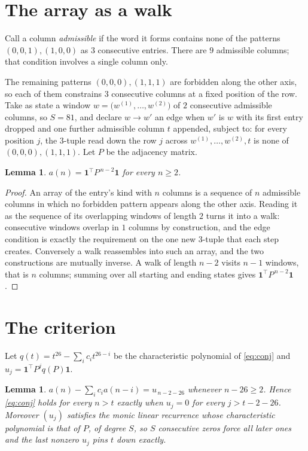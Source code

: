 \documentclass[11pt,a4paper]{article}
\theoremstyle{plain}
\newtheorem{lemma}[theorem]{Lemma}
\theoremstyle{definition}
\begin{document}
\section{The array as a walk}

Call a column \emph{admissible} if the word it forms contains none of the patterns
$(0,0,1), (1,0,0)$ as $3$ consecutive entries. There are $9$ admissible columns; that condition
involves a single column only.

The remaining patterns $(0,0,0), (1,1,1)$ are forbidden along the other axis, so each of them
constrains $3$ consecutive columns at a fixed position of the row. Take as state a
window $w=\bigl(w^{(1)},\dots,w^{(2)}\bigr)$ of $2$ consecutive admissible
columns, so $S=81$, and declare $w\to w'$ an edge when $w'$ is $w$ with its first entry
dropped and one further admissible column $t$ appended, subject to: for every position
$j$, the $3$-tuple read down the row $j$ across $w^{(1)},\dots,w^{(2)},t$
is none of $(0,0,0), (1,1,1)$. Let $P$ be the adjacency matrix.

\begin{lemma}\label{lem:walk}
$a(n)=\mathbf{1}^{\!\top}P^{\,n-2}\mathbf{1}$ for every $n\ge2$.
\end{lemma}

\begin{proof}
An array of the entry's kind with $n$ columns is a sequence of $n$ admissible columns in
which no forbidden pattern appears along the other axis. Reading it as the sequence of its
overlapping windows of length $2$ turns it into a walk: consecutive windows overlap in
$1$ columns by construction, and the edge condition is exactly the requirement on the one
new $3$-tuple that each step creates. Conversely a walk reassembles into such an array,
and the two constructions are mutually inverse. A walk of length $n-2$ visits $n-1$
windows, that is $n$ columns; summing over all starting and ending states gives
$\mathbf{1}^{\!\top}P^{\,n-2}\mathbf{1}$.
\end{proof}

\section{The criterion}

Let $q(t)=t^{26}-\sum_i c_i t^{26-i}$ be the characteristic polynomial of
\eqref{eq:conj} and $u_j=\mathbf{1}^{\!\top}P^{j}q(P)\mathbf{1}$.

\begin{lemma}\label{lem:crit}
$a(n)-\sum_i c_i a(n-i)=u_{\,n-2-26}$ whenever $n-26\ge2$. Hence
\eqref{eq:conj} holds for every $n>t$ exactly when $u_j=0$ for every
$j>t-2-26$. Moreover $(u_j)$ satisfies the monic linear recurrence whose
characteristic polynomial is that of $P$, of degree $S$, so $S$ consecutive zeros force all
later ones and the last nonzero $u_j$ pins $t$ down exactly.
\end{lemma}
\end{document}
